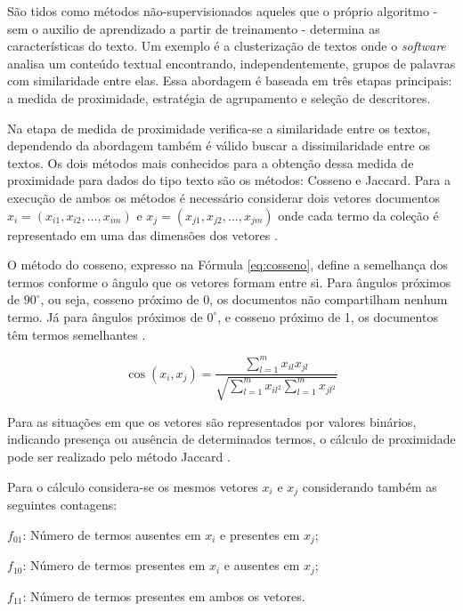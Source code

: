 
São tidos como métodos não-supervisionados aqueles que o próprio algoritmo - sem o auxilio de aprendizado a partir de treinamento - determina as características do texto. Um exemplo é a clusterização de textos onde o \textit{software} analisa um conteúdo textual encontrando, independentemente, grupos de palavras com similaridade entre elas. Essa abordagem é baseada em três etapas principais: a medida de proximidade, estratégia de agrupamento e seleção de descritores.

Na etapa de medida de proximidade verifica-se a similaridade entre os textos, dependendo da abordagem também é válido buscar a dissimilaridade entre os textos. Os dois métodos mais conhecidos para a obtenção dessa medida de proximidade para dados do tipo texto são os métodos: Cosseno e Jaccard. Para a execução de ambos os métodos é necessário considerar dois vetores documentos $x_{i}=\left ( x_{i1}, x_{i2}, \dotsc, x_{im}\right )$ e $x_{j}=\left ( x_{j1}, x_{j2}, \dotsc, x_{jm}\right )$ onde cada termo da coleção é representado em uma das dimensões dos vetores \cite{Rezende2011}.

O método do cosseno, expresso na Fórmula \ref{eq:cosseno}, define a semelhança dos termos conforme o ângulo que os vetores formam entre si. Para ângulos próximos de $90^{\circ}$, ou seja, cosseno próximo de 0, os documentos não compartilham nenhum termo. Já para ângulos próximos de $0^{\circ}$, e  cosseno próximo de 1, os documentos têm termos semelhantes \cite{Rezende2011}.

\begin{equation}
    \label{eq:cosseno}
     \cos \left ( x_{i},x_{j} \right ) = \frac{\sum_{l=1}^{m} x_{il} x_{jl}}{\sqrt{\sum_{l=1}^{m} x_{il^{2}} \sum_{l=1}^{m} x_{jl^{2}}} }
\end{equation}

Para as situações em que os vetores são representados por valores binários, indicando presença ou ausência de determinados termos, o cálculo de proximidade pode ser realizado pelo método Jaccard \cite{Rezende2011}.

Para o cálculo considera-se os mesmos vetores $x_{i}$ e $x_{j}$  considerando também as seguintes contagens:

$f_{01}$: Número de termos ausentes em $x_{i}$ e presentes em $x_{j}$;

$f_{10}$: Número de termos presentes em $x_{i}$ e ausentes em $x_{j}$;

$f_{11}$: Número de termos presentes em ambos os vetores.

